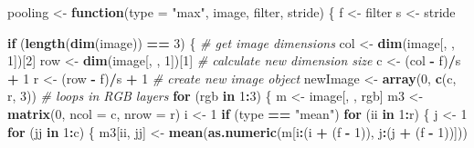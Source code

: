 \documentclass[12pt,]{krantz}
\makeatletter
\newenvironment{Shaded}{\begin{snugshade}}{\end{snugshade}}
\newcommand{\CommentTok}[1]{\textcolor[rgb]{0.37,0.37,0.37}{\textit{#1}}}
\newcommand{\ControlFlowTok}[1]{\textcolor[rgb]{0.27,0.27,0.27}{\textbf{#1}}}
\newcommand{\DataTypeTok}[1]{\textcolor[rgb]{0.27,0.27,0.27}{#1}}
\newcommand{\DecValTok}[1]{\textcolor[rgb]{0.06,0.06,0.06}{#1}}
\newcommand{\KeywordTok}[1]{\textcolor[rgb]{0.27,0.27,0.27}{\textbf{#1}}}
\newcommand{\NormalTok}[1]{#1}
\newcommand{\OperatorTok}[1]{\textcolor[rgb]{0.43,0.43,0.43}{\textbf{#1}}}
\newcommand{\StringTok}[1]{\textcolor[rgb]{0.5,0.5,0.5}{#1}}
\newenvironment{kframe}{%
\medskip{}
\setlength{\fboxsep}{.8em}
 \def\at@end@of@kframe{}%
 \ifinner\ifhmode%
  \def\at@end@of@kframe{\end{minipage}}%
  \begin{minipage}{\columnwidth}%
 \fi\fi%
 \def\FrameCommand##1{\hskip\@totalleftmargin \hskip-\fboxsep
 \colorbox{shadecolor}{##1}\hskip-\fboxsep
     \hskip-\linewidth \hskip-\@totalleftmargin \hskip\columnwidth}%
 \MakeFramed {\advance\hsize-\width
   \@totalleftmargin\z@ \linewidth\hsize
   \@setminipage}}%
 {\par\unskip\endMakeFramed%
 \at@end@of@kframe}
\renewenvironment{Shaded}{\begin{kframe}}{\end{kframe}}
\makeatother
\begin{document}
\begin{Shaded}
\begin{Highlighting}[]
\NormalTok{pooling <-}\StringTok{ }\ControlFlowTok{function}\NormalTok{(}\DataTypeTok{type =} \StringTok{"max"}\NormalTok{, image, filter, stride) \{}
\NormalTok{    f <-}\StringTok{ }\NormalTok{filter}
\NormalTok{    s <-}\StringTok{ }\NormalTok{stride}
    
    \ControlFlowTok{if}\NormalTok{ (}\KeywordTok{length}\NormalTok{(}\KeywordTok{dim}\NormalTok{(image)) }\OperatorTok{==}\StringTok{ }\DecValTok{3}\NormalTok{) \{}
        \CommentTok{# get image dimensions}
\NormalTok{        col <-}\StringTok{ }\KeywordTok{dim}\NormalTok{(image[, , }\DecValTok{1}\NormalTok{])[}\DecValTok{2}\NormalTok{]}
\NormalTok{        row <-}\StringTok{ }\KeywordTok{dim}\NormalTok{(image[, , }\DecValTok{1}\NormalTok{])[}\DecValTok{1}\NormalTok{]}
        \CommentTok{# calculate new dimension size}
\NormalTok{        c <-}\StringTok{ }\NormalTok{(col }\OperatorTok{-}\StringTok{ }\NormalTok{f)}\OperatorTok{/}\NormalTok{s }\OperatorTok{+}\StringTok{ }\DecValTok{1}
\NormalTok{        r <-}\StringTok{ }\NormalTok{(row }\OperatorTok{-}\StringTok{ }\NormalTok{f)}\OperatorTok{/}\NormalTok{s }\OperatorTok{+}\StringTok{ }\DecValTok{1}
        \CommentTok{# create new image object}
\NormalTok{        newImage <-}\StringTok{ }\KeywordTok{array}\NormalTok{(}\DecValTok{0}\NormalTok{, }\KeywordTok{c}\NormalTok{(c, r, }\DecValTok{3}\NormalTok{))}
        \CommentTok{# loops in RGB layers}
        \ControlFlowTok{for}\NormalTok{ (rgb }\ControlFlowTok{in} \DecValTok{1}\OperatorTok{:}\DecValTok{3}\NormalTok{) \{}
\NormalTok{            m <-}\StringTok{ }\NormalTok{image[, , rgb]}
\NormalTok{            m3 <-}\StringTok{ }\KeywordTok{matrix}\NormalTok{(}\DecValTok{0}\NormalTok{, }\DataTypeTok{ncol =}\NormalTok{ c, }\DataTypeTok{nrow =}\NormalTok{ r)}
\NormalTok{            i <-}\StringTok{ }\DecValTok{1}
            \ControlFlowTok{if}\NormalTok{ (type }\OperatorTok{==}\StringTok{ "mean"}\NormalTok{) }
                \ControlFlowTok{for}\NormalTok{ (ii }\ControlFlowTok{in} \DecValTok{1}\OperatorTok{:}\NormalTok{r) \{}
\NormalTok{                  j <-}\StringTok{ }\DecValTok{1}
                  \ControlFlowTok{for}\NormalTok{ (jj }\ControlFlowTok{in} \DecValTok{1}\OperatorTok{:}\NormalTok{c) \{}
\NormalTok{                    m3[ii, jj] <-}\StringTok{ }\KeywordTok{mean}\NormalTok{(}\KeywordTok{as.numeric}\NormalTok{(m[i}\OperatorTok{:}\NormalTok{(i }\OperatorTok{+}\StringTok{ }
\StringTok{                      }\NormalTok{(f }\OperatorTok{-}\StringTok{ }\DecValTok{1}\NormalTok{)), j}\OperatorTok{:}\NormalTok{(j }\OperatorTok{+}\StringTok{ }\NormalTok{(f }\OperatorTok{-}\StringTok{ }\DecValTok{1}\NormalTok{))]))}

\end{Highlighting}
\end{Shaded}
\end{document}
